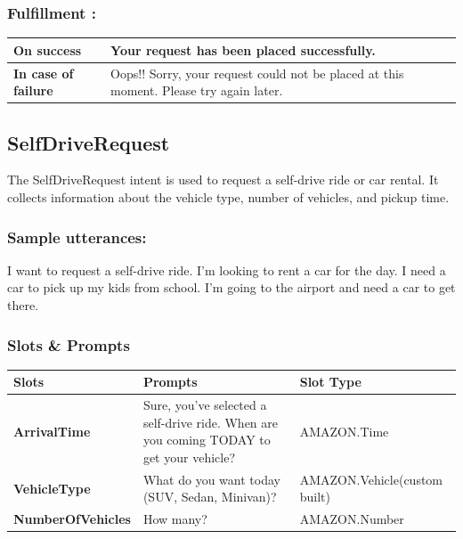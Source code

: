 \subsubsection{Fulfillment :}

\begin{table}[h]
\centering
\begin{tabular}{|m{4cm}|m{7cm}|}
\hline
\textbf{On success} & Your request has been placed successfully. \\
\hline
\textbf{In case of failure} & Oops!! Sorry, your request could not be placed at this moment. Please try again later. \\
\hline
\end{tabular}
\end{table}


\subsection{SelfDriveRequest}
The SelfDriveRequest intent is used to request a self-drive ride or car rental. It collects information about the vehicle type, number of vehicles, and pickup time.

\subsubsection{Sample utterances: }
I want to request a self-drive ride. \newline
I'm looking to rent a car for the day.\newline
I need a car to pick up my kids from school.\newline
I'm going to the airport and need a car to get there.\newline

\newpage
\subsubsection{Slots \& Prompts }
\begin{table}[h]
\centering
\begin{tabular}{|>{\bfseries}m{4cm}|m{8cm}|m{5cm}|}
\hline
\textbf{Slots} & \textbf{Prompts} & \textbf{Slot Type} \\
\hline
ArrivalTime & Sure, you've selected a self-drive ride. When are you coming TODAY to get your vehicle? & AMAZON.Time \\
\hline
VehicleType & What do you want today (SUV, Sedan, Minivan)? & AMAZON.Vehicle(custom built) \\
\hline
NumberOfVehicles & How many? & AMAZON.Number \\
\hline
\end{tabular}
\end{table}


